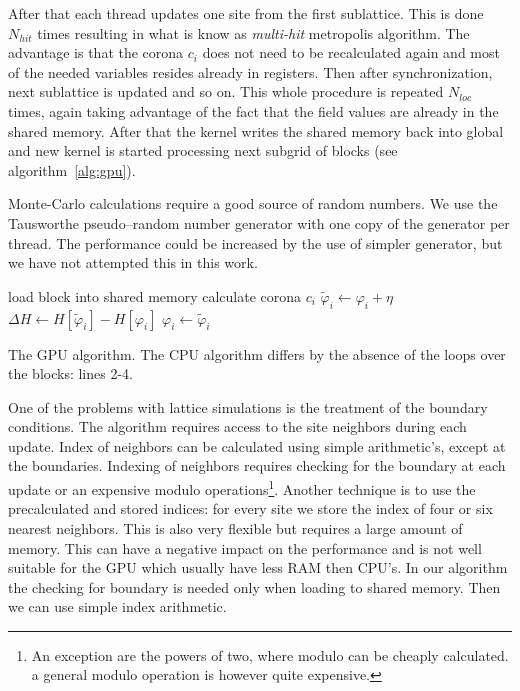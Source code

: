 \documentclass[a4paper]{llncs}
\newcommand{\vphi}{\varphi}
\begin{document}
After that each thread updates one site
from the first sublattice. This is done $N_{hit}$ times resulting in
what is know as {\em multi-hit} metropolis algorithm. The advantage is
that the corona $c_i$ does not need to be recalculated again and most
of the needed variables resides already in registers.  Then after
synchronization, next sublattice is updated and so on. This whole
procedure is repeated $N_{loc}$ times, again taking advantage of
the fact that the field values are already in the shared memory. After
that the kernel writes the shared memory back into global and new
kernel is started processing next subgrid of blocks (see
algorithm~\ref{alg:gpu}).

Monte-Carlo calculations require a good source of random numbers. We
use the Tausworthe pseudo--random number
generator\cite{howes_thomas07} with one copy of the generator per
thread. The performance could be increased by the use of simpler
generator, but we have not attempted this in this work.

\begin{algorithm}
\begin{algorithmic}[1]
\State load block  into shared memory
\State calculate corona $c_i$ 
\State $\widetilde{\vphi}_i \gets \vphi_i+\eta$
\State $\Delta H \gets H[\widetilde{\vphi}_i]-H[\vphi_i]$
\State $\vphi_i \gets \widetilde{\vphi}_i$
\EndIf
\EndFor
\EndFor 
{}
\EndFor
\EndFor
\EndFor
\EndFor
\end{algorithmic}
\caption{\label{alg:gpu} The GPU algorithm. The CPU algorithm differs
  by the absence of the loops over the blocks: lines 2-4.}
\end{algorithm}


One of the problems with lattice simulations is the treatment of the boundary conditions. The
algorithm requires access to the site neighbors during each update. Index of neighbors can be
calculated using simple arithmetic's, except at the boundaries. Indexing of neighbors requires
checking for the boundary at each update or an expensive modulo operations\footnote{An exception are
  the powers of two, where modulo can be cheaply calculated. a general modulo operation is however
  quite expensive. }. Another technique is to use the precalculated and stored indices: for every
site we store the index of four or six nearest neighbors. This is also very flexible but requires a
large amount of memory. This can have a negative impact on the performance and is not well suitable
for the GPU which usually have less RAM then CPU's. In our algorithm the checking for boundary is
needed only when loading to shared memory. Then we can use simple index arithmetic.
\end{document}

